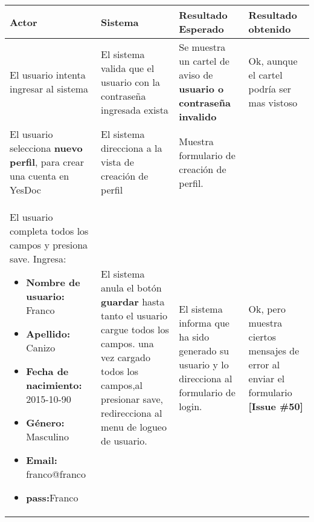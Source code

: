   {\scriptsize
  \begin{longtable}{|p{4cm}|p{4cm}|p{4cm}|p{3cm}|}
  	\hline
  	Actor  & Sistema& Resultado Esperado & Resultado obtenido \\ \hline
  	
  	El usuario intenta ingresar al sistema & El sistema valida que el usuario con la contraseña ingresada exista 
  	& Se muestra un cartel de aviso de \textbf{usuario o contraseña invalido} 
  	& Ok, aunque el cartel podría ser mas vistoso 
  	\\ \hline
  	
  	
  	
  	El usuario selecciona \textbf{nuevo perfil}, para
  	crear una cuenta en YesDoc 
  	& El sistema direcciona a la vista de creación de perfil
  	& Muestra formulario de creación de perfil.
  	&
  	\\ \hline
  	
  	
  	
  	El usuario completa todos los campos y presiona save.
  	Ingresa:
  	\begin{itemize}
  		\item \textbf{Nombre de usuario:} Franco
  		\item \textbf{Apellido:} Canizo
  		\item \textbf{Fecha de nacimiento: }2015-10-90
  		\item \textbf{Género: }Masculino
  		\item \textbf{Email: }franco@franco
  		\item \textbf{pass:}Franco
  		
  	\end{itemize}
  	& El sistema anula el botón \textbf{guardar }hasta tanto el usuario cargue todos los campos. una vez cargado todos los campos,al presionar save, redirecciona al menu
  	de logueo de usuario.
  	& El sistema informa que ha sido generado su usuario y lo direcciona al formulario de login.
  	& Ok, pero muestra ciertos mensajes de error al enviar el formulario \textbf{[Issue \#50]}
  	\\ \hline
  	
  	
  	

\end{longtable}}
